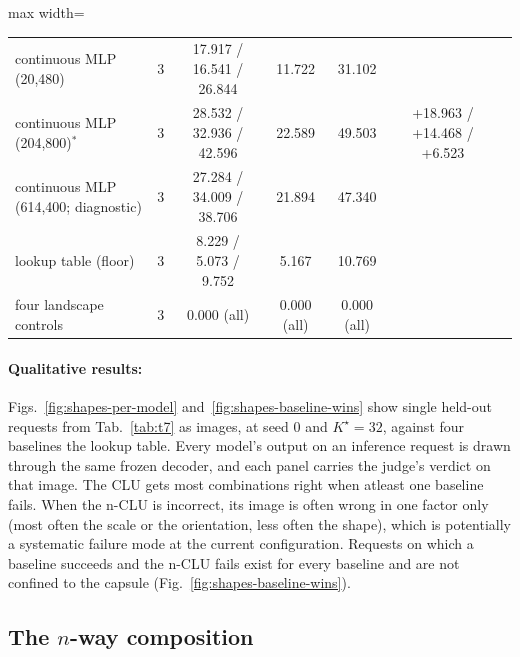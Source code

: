 \documentclass{article} %
\newcommand{\Kstar}{\ensuremath{K^{\star}}}
\begin{document}
\begin{table}[htb]
\begin{adjustbox}{max width=\linewidth}
\begin{tabular}{lcccccc}
continuous MLP (20,480) & 3 & 17.917 / 16.541 / 26.844 & 11.722 & 31.102 & & \\
continuous MLP (204,800)$^\ast$ & 3 & 28.532 / 32.936 / 42.596 & 22.589 & 49.503 & +18.963 / +14.468 / +6.523 & \\
continuous MLP (614,400; diagnostic) & 3 & 27.284 / 34.009 / 38.706 & 21.894 & 47.340 & & \\
lookup table (floor) & 3 & 8.229 / 5.073 / 9.752 & 5.167 & 10.769 & & \\
\midrule
four landscape controls & 3 & 0.000 (all) & 0.000 (all) & 0.000 (all) & & \\
\bottomrule
\end{tabular}\end{adjustbox}
\end{table}

\paragraph{Qualitative results:} Figs.~\ref{fig:shapes-per-model} and~\ref{fig:shapes-baseline-wins}
show single held-out requests from Tab.~\ref{tab:t7} as images, at seed 0 and $\Kstar=32$, against four baselines the lookup table. Every model's output on an inference request is drawn through the same frozen decoder, and each panel carries the judge's verdict on that image. The CLU gets most combinations right when atleast one baseline fails. When the n-CLU is incorrect, its image is often wrong in one factor only (most often the scale or the orientation, less often the shape), which is potentially a systematic failure mode at the current configuration. Requests on which a baseline succeeds and the n-CLU fails exist for every baseline and are not confined to the capsule 
(Fig.~\ref{fig:shapes-baseline-wins}).

\subsection{The $n$-way composition}
\label{sec:ladder}
\end{document}
